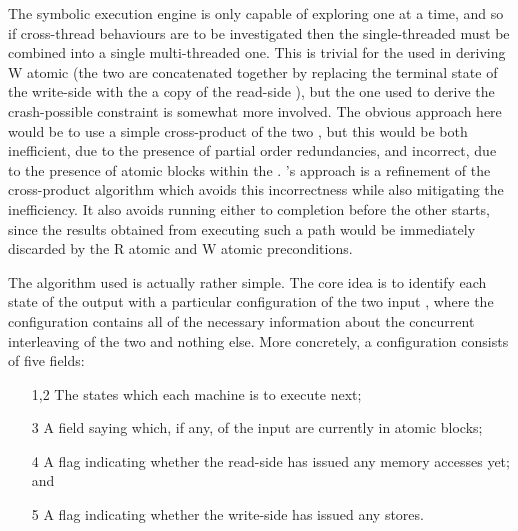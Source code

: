 The symbolic execution engine is only capable of exploring one
{\StateMachine} at a time, and so if cross-thread behaviours are to be
investigated then the single-threaded {\StateMachines} must be
combined into a single multi-threaded one.  This is trivial for the
{\StateMachine} used in deriving W atomic (the two {\StateMachines}
are concatenated together by replacing the terminal state of the
write-side {\StateMachine} with the a copy of the read-side
{\StateMachine}), but the one used to derive the crash-possible
constraint is somewhat more involved.  The obvious approach here would
be to use a simple cross-product of the two {\StateMachines},
but this would be both inefficient, due to the presence of partial
order redundancies\needCite{}, and incorrect, due to the presence of
atomic blocks within the {\StateMachines}.  {\Technique}'s approach is
a refinement of the cross-product algorithm which avoids this
incorrectness while also mitigating the inefficiency.  It also avoids
running either {\StateMachine} to completion before the other starts,
since the results obtained from executing such a path would be
immediately discarded by the R atomic and W atomic preconditions.


The algorithm used is actually rather simple.  The core idea is to
identify each state of the output {\StateMachine} with a particular
configuration of the two input {\StateMachines}, where the
configuration contains all of the necessary information about the
concurrent interleaving of the two {\StateMachines} and nothing else.
More concretely, a configuration consists of five fields:

\begin{itemize}
\item[1,2] The {\StateMachine} states which each machine is to execute
  next;
\item[3] A field saying which, if any, of the input {\StateMachines}
  are currently in atomic blocks;
\item[4] A flag indicating whether the read-side {\StateMachine} has
  issued any memory accesses yet; and
\item[5] A flag indicating whether the write-side {\StateMachine} has
  issued any stores.
\end{itemize}

